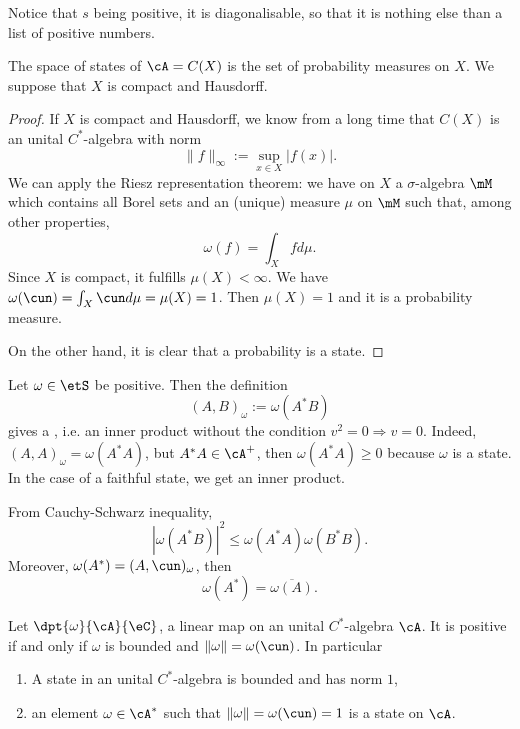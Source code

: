 Notice that $s$ being positive, it is diagonalisable, so that it is nothing else than a list of positive numbers.


\begin{theorem}
	The space of states of $\cA=C(X)$ is the set of probability measures on $X$. We suppose that $X$ is compact and Hausdorff.
\end{theorem}

\begin{proof}
	If $X$ is compact and Hausdorff, we know from a long time that $C(X)$ is an unital $C^*$-algebra with norm
	\[
		\| f \|_{\infty}:=\sup_{x\in X}| f(x) |.
	\]
	We can apply the Riesz representation theorem: we have on $X$ a $\sigma$-algebra $\mM$ which contains all Borel sets and an (unique) measure $\mu$ on $\mM$ such that, among other properties,
	\begin{equation}
		\omega(f)=\int_Xfd\mu.
	\end{equation}
	Since $X$ is compact, it fulfills $\mu(X)<\infty$. We have $\omega(\cun)=\int_X\cun d\mu=\mu(X)=1$. Then $\mu(X)=1$ and it is a probability measure.

	On the other hand, it is clear that a probability is a state.

\end{proof}

Let $\omega\in\etS$ be positive. Then the definition\label{PgStateInn}
\begin{equation} \label{eq:defprodetat}
	(A,B)_{\omega}:=\omega(A^*B)
\end{equation}
gives a \label{pgdef_preinned}, i.e. an inner product without the condition $v^2=0\Rightarrow v=0$. Indeed, $(A,A)_{\omega}=\omega(A^*A)$, but $A^*A\in\cA^+$, then $\omega(A^*A)\geq 0$ because $\omega$ is a state. In the case of a faithful state, we get an inner product.

From Cauchy-Schwarz inequality,
\begin{equation} \label{eq:omABleq}
	| \omega(A^*B) |^2\leq \omega(A^*A)\omega(B^*B).
\end{equation}
Moreover, $\omega(A^*)=(A,\cun)_{\omega}$, then
\begin{equation} \label{eq:omABleqs}
	\omega(A^*)=\overline{\omega(A)}.
\end{equation}

\begin{proposition}
	Let $\dpt{\omega}{\cA}{\eC}$, a linear map on an unital $C^*$-algebra $\cA$. It is positive if and only if $\omega$ is bounded and $\| \omega \|=\omega(\cun)$. In particular

	\begin{enumerate}
		\item A state in an unital $C^*$-algebra is bounded and has norm $1$, \label{71125ai}
		\item an element $\omega\in\cA^*$ such that $\| \omega \|=\omega(\cun)=1$ is a state on $\cA$. \label{7125aii}
	\end{enumerate}
	\label{prop:linposboun}
\end{proposition}


